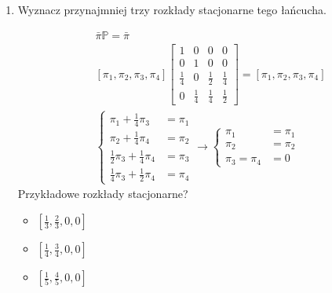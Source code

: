 \begin{enumerate}[label=\alph*)]
\item Wyznacz przynajmniej trzy rozkłady stacjonarne tego łańcucha.

\begin{align*}
&\bar{\pi}\mathbb{P}=\bar{\pi}\\
&\left[\pi _1, \pi _2,\pi _3,\pi _4\right]\begin{bmatrix}
1&0&0&0\\
0&1&0&0\\
\frac{1}{4}&0&\frac{1}{2}&\frac{1}{4}\\
0&\frac{1}{4}&\frac{1}{4}&\frac{1}{2}
\end{bmatrix}=\left[\pi _1, \pi _2,\pi _3,\pi _4\right]\\
&\left\{\begin{matrix}
\pi _1 +\frac{1}{4}\pi _3 &= \pi _1\\
\pi _2 + \frac{1}{4}\pi _4 &= \pi _2\\
\frac{1}{2}\pi _3+\frac{1}{4}\pi _4 &= \pi _3\\
\frac{1}{4}\pi _3+\frac{1}{2}\pi _4 &= \pi _4
\end{matrix}\right.\rightarrow \left\{\begin{matrix}
\pi _1 &= \pi _1\\
\pi _2 &= \pi _2\\
\pi _3 = \pi _4 &= 0
\end{matrix}\right.
\end{align*}
Przykładowe rozkłady stacjonarne?
\begin{itemize}
\item $ \left[\frac{1}{3}, \frac{2}{3},0,0\right]$
\item $ \left[\frac{1}{4}, \frac{3}{4},0,0\right]$
\item $ \left[\frac{1}{5}, \frac{4}{5},0,0\right]$
\end{itemize}


\end{enumerate}

